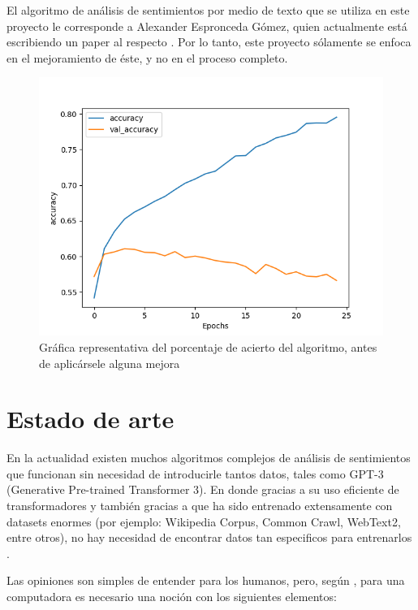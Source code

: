 \documentclass[a4]{sciposter}
\begin{document}
\begin{multicols}{2}
El algoritmo de análisis de sentimientos por medio de texto que se utiliza en este proyecto le corresponde a Alexander Espronceda Gómez, quien actualmente está escribiendo un paper al respecto \citep{chatbot}. Por lo tanto, este proyecto sólamente se enfoca en el mejoramiento de éste, y no en el proceso completo.
\begin{figure}
	\centering
	\captionsetup{type=figure}
	\setcounter{figure}{0}
	\includegraphics[scale=1.5]{img/Accuracy 2020-05_nofilter}
	\caption{Gráfica representativa del porcentaje de acierto del algoritmo, antes de aplicársele alguna mejora}
	
\end{figure}

\section{Estado de arte}

En la actualidad existen muchos algoritmos complejos de análisis de sentimientos que funcionan sin necesidad de introducirle tantos datos, tales como GPT-3 (Generative Pre-trained Transformer 3). En donde gracias a su uso eficiente de transformadores y también gracias a que ha sido entrenado extensamente con datasets enormes (por ejemplo: Wikipedia Corpus, Common Crawl, WebText2, entre otros), no hay necesidad de encontrar datos tan especificos para entrenarlos \citep{gpt3}.

Las opiniones son simples de entender para los humanos, pero, según \citet{liu}, para una computadora es necesario una noción con los siguientes elementos:


\end{multicols}
\end{document}

